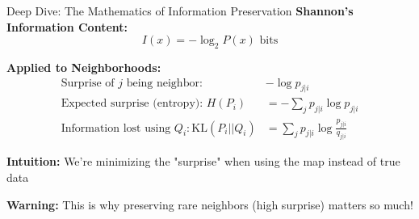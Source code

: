 \documentclass[aspectratio=169]{beamer}
\newcommand{\warning}[1]{\colorbox{red!10}{\textcolor{warningcolor}{\textbf{Warning:} #1}}}
\newcommand{\intuition}[1]{\colorbox{green!10}{\textcolor{intuitioncolor}{\textbf{Intuition:} #1}}}
\begin{document}
\begin{frame}{Deep Dive: The Mathematics of Information Preservation}
\textbf{Shannon's Information Content:}
$$I(x) = -\log_2 P(x) \text{ bits}$$

\textbf{Applied to Neighborhoods:}
\begin{align}
\text{Surprise of } j \text{ being neighbor: } &-\log p_{j|i}\\
\text{Expected surprise (entropy): } H(P_i) &= -\sum_j p_{j|i}\log p_{j|i}\\
\text{Information lost using } Q_i: \text{KL}(P_i||Q_i) &= \sum_j p_{j|i}\log\frac{p_{j|i}}{q_{j|i}}
\end{align}

\intuition{We're minimizing the "surprise" when using the map instead of true data}

\warning{This is why preserving rare neighbors (high surprise) matters so much!}
\end{frame}
\end{document}
